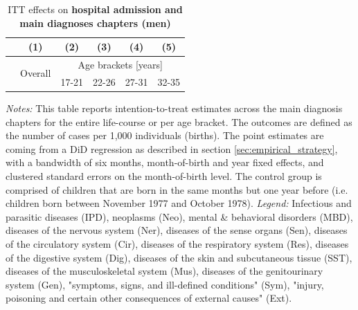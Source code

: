 \documentclass[11pt, a4paper]{article} %
\begin{document}
\newpage
{} 
\vspace*{\fill}
\begin{table}[H] \centering 
	\begin{threeparttable} \centering \caption{ITT effects on \textbf{hospital admission and main diagnoses chapters (men)}}\label{tab: ITT_across_chapters_per_age_group_men}
		{\def\sym#1{\ifmmode^{#1}\else\(^{#1}\)\fi} 
			\begin{tabular}{l*{5}{c}}
				\toprule 
				&\multicolumn{1}{c}{(1)}&\multicolumn{1}{c}{(2)}&\multicolumn{1}{c}{(3)}&\multicolumn{1}{c}{(4)}&\multicolumn{1}{c}{(5)}\\
				\midrule
				&\multirow{2}{*}{Overall} & \multicolumn{4}{c}{Age brackets [years]} \\ 
				\cmidrule(lr){3-6}
				&&\multicolumn{1}{c}{17-21}&\multicolumn{1}{c}{22-26}&\multicolumn{1}{c}{27-31}&\multicolumn{1}{c}{32-35}\\
				
				\midrule
				
				
				
				\bottomrule 
		\end{tabular}}
	\end{threeparttable} 
	\begin{minipage}{0.9\linewidth}
		\scriptsize \emph{Notes:} This table reports intention-to-treat estimates across the main diagnosis chapters for the entire life-course or per age bracket. The outcomes are defined as the number of cases per 1,000 individuals (births). The point estimates are coming from a DiD regression as described in section \ref{sec:empirical_strategy}, with a bandwidth of six months, month-of-birth and year fixed effects, and clustered standard errors on the month-of-birth level. The control group is comprised of children that are born in the same months but one year before (i.e. children born between November 1977 and October 1978).\newline
		\emph{Legend:} Infectious and parasitic diseases (IPD), neoplasms (Neo), mental \& behavioral disorders (MBD), diseases of the nervous system (Ner), diseases of the sense organs (Sen), diseases of the circulatory system (Cir), diseases of the respiratory system (Res), diseases of the digestive system (Dig), diseases of the skin and subcutaneous tissue (SST), diseases of the musculoskeletal system (Mus), diseases of the genitourinary system (Gen), "symptoms, signs, and ill-defined conditions" (Sym), "injury, poisoning and certain other consequences of external causes" (Ext).
	\end{minipage}
\end{table} 
\vspace*{\fill}\clearpage 
\restoregeometry
\end{document}
